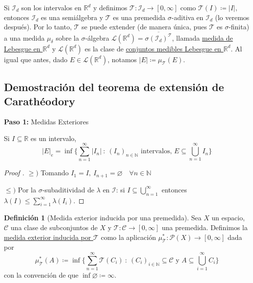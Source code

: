 \documentclass[11pt]{article}
\theoremstyle{definition} %
\newtheorem{definition}[theorem]{Definición}
\newcommand{\R}{\mathbb{R}}
\newcommand{\N}{\mathbb{N}}
\begin{document}
\begin{property}
\begin{eg}[Medida de Lebesgue en $\R^d$]
	Si $\mathcal{I}_d$ son los intervalos en $\R^d$ y definimos $\mathcal{T}:\mathcal{I}_d \to [0,\infty]$ como $\mathcal{T}(I)\coloneq|I|$, entonces $\mathcal{I}_d$ es una semiálgebra y $\mathcal{T}$ es una premedida $\sigma$-aditiva en $\mathcal{I}_d$ (lo veremos después). Por lo tanto, $\mathcal{T}$ se puede extender (de manera única, pues $\mathcal{T}$ es $\sigma$-finita) a una medida $\mu_{\delta}$ sobre la $\sigma$-álgebra $\mathscr{L}(\R^d) = \overline{\sigma(\mathcal{I}_d)^{\mathcal{T}}}$, llamada \underline{medida de Lebesgue en $\R^d$} y $\mathscr{L}(\R^d)$ es la clase de \underline{conjuntos medibles Lebesgue en $\R^d$}. Al igual que antes, dado $E \in \mathscr{L}(\R^d)$, notamos $|E| \coloneq \mu_{\mathcal{T}}(E)$.
\end{eg}

\subsection*{Demostración del teorema de extensión de Carathéodory}

\textbf{Paso 1:} Medidas Exteriores

\begin{prop}
	Si $I \subseteq \R$ es un intervalo,
	\[ |E|_{e} = \inf \{ \sum_{n=1}^{\infty} |I_n| \ : \  (I_n)_{n\in\N} \text{ intervalos, } E \subseteq \bigcup_{n=1}^{\infty} I_n \} \]
\end{prop}
\begin{proof}[Proof ]
	$\geq)$ Tomando $I_1 = I,\ I_{n+1} = \varnothing \quad \forall n \in \N$ \newline

	$\leq)$ Por la $\sigma$-subaditividad de $\lambda$ en $\mathcal{I}$: si $I\subseteq \bigcup_{n=1}^{\infty}$ entonces $\lambda(I) \leq \sum_{i=1}^{\infty} \lambda(I_i)$.
\end{proof}

\begin{definition}[Medida exterior inducida por una premedida]
	Sea $X$ un espacio, $\mathscr{C}$ una clase de subconjuntos de $X$ y $\mathcal{T} : \mathscr{C} \to [0,\infty]$ una premedida. Definimos la \underline{medida exterior inducida por $\mathcal{T}$} como la aplicación $\mu_{\mathcal{T}}^{*} : \mathscr{P}(X) \to [0,\infty]$ dada por
	\[ \mu_{\mathcal{T}}^{*}(A) \coloneq \inf \{ \sum_{n=1}^{\infty} \mathcal{T}(C_i) \ : \ (C_i)_{i\in\N} \subseteq \mathscr{C} \text{ y } A \subseteq \bigcup_{i=1}^{\infty} C_i \} \]
	con la convención de que $\inf \varnothing \coloneq \infty$.
\end{definition}


\end{property}
\end{document}
